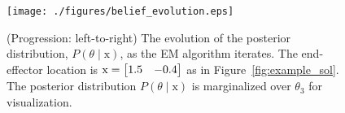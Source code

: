 \begin{figure}[t]
    \centering
	\texttt{[image: ./figures/belief\_evolution.eps]}
    \caption{(Progression: left-to-right) The evolution of the posterior
    distribution, $P(\theta \mid \mathrm{x})$, as the EM algorithm iterates. The
    end-effector location is $\mathrm{x} = \begin{bmatrix}1.5 & -0.4\end{bmatrix}$ as in
    Figure~\ref{fig:example_sol}. The posterior distribution $P(\theta \mid
    \mathrm{x})$ is marginalized over $\theta_3$ for visualization.}
    \label{fig:belief_evolution}
\end{figure}